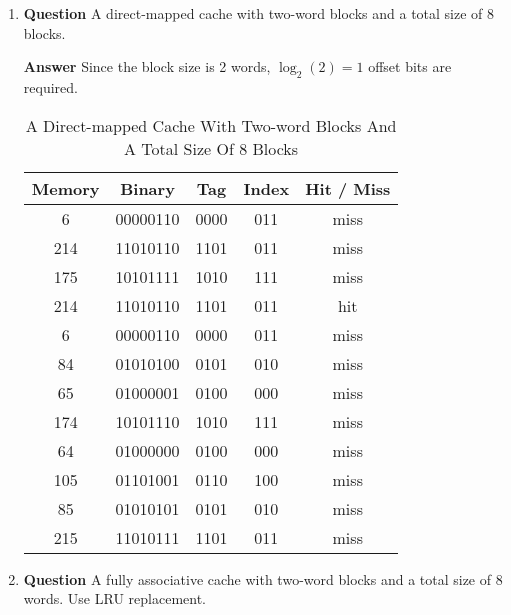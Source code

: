 \documentclass[10pt]{extarticle}
\begin{document}
\begin{enumerate}
\begin{enumerate}
            \item \textbf{Question} A direct-mapped cache with two-word blocks
            and a total size of 8 blocks.

            \textbf{Answer}
            Since the block size is 2 words, $\log_{2}(2)=1$ offset bits are
            required.
            \begin{table}[h]
                \centering
                \caption{A Direct-mapped Cache With Two-word Blocks And A Total
                Size Of 8 Blocks}
                \begin{tabular*}{300pt}{@{\extracolsep{\fill}} ccccc}
                    \textbf{Memory} & \textbf{Binary} & \textbf{Tag} &
                    \textbf{Index} & \textbf{Hit / Miss} \\
                    \hline
                    6   & 00000110  & 0000  & 011   & miss  \\
                    214 & 11010110  & 1101  & 011   & miss  \\
                    175 & 10101111  & 1010  & 111   & miss  \\
                    214 & 11010110  & 1101  & 011   & hit   \\
                    6   & 00000110  & 0000  & 011   & miss  \\
                    84  & 01010100  & 0101  & 010   & miss  \\
                    65  & 01000001  & 0100  & 000   & miss  \\
                    174 & 10101110  & 1010  & 111   & miss  \\
                    64  & 01000000  & 0100  & 000   & miss  \\
                    105 & 01101001  & 0110  & 100   & miss  \\
                    85  & 01010101  & 0101  & 010   & miss  \\
                    215 & 11010111  & 1101  & 011   & miss  \\
                \end{tabular*}
            \end{table}
            \newpage

            \item \textbf{Question} A fully associative cache with two-word
            blocks and a total size of 8 words. Use LRU replacement.


\end{enumerate}
\end{enumerate}
\end{document}
